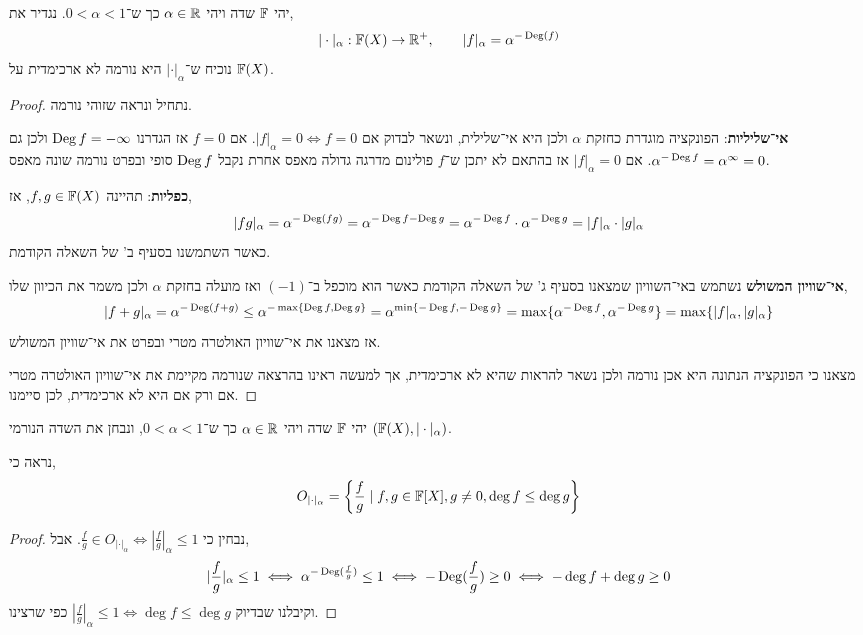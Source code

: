 \question{}
יהי $\mathbb{F}$ שדה ויהי $\alpha \in \mathbb{R}$ כך ש־$0 < \alpha < 1$.
נגדיר את,
\[
	| \cdot |_{\alpha} : \mathbb{F}(X) \to \mathbb{R}^+,
	\qquad
	| f |_{\alpha} = \alpha^{- \operatorname{Deg}(f)}
\]
נוכיח ש־$| \cdot |_{\alpha}$ היא נורמה לא ארכימדית על $\mathbb{F}(X)$.
\begin{proof}
	נתחיל ונראה שזוהי נורמה.

	\textbf{אי־שליליות}:
	הפונקציה מוגדרת כחזקת $\alpha$ ולכן היא אי־שלילית, ונשאר לבדוק אם $|f|_{\alpha} = 0 \iff f = 0$.
	אם $f = 0$ אז הגדרנו $\operatorname{Deg} f = - \infty$ ולכן גם $\alpha^{- \operatorname{Deg} f} = \alpha^{\infty} = 0$.
	אם $|f|_{\alpha} = 0$ אז בהתאם לא יתכן ש־$f$ פולינום מדרגה גדולה מאפס אחרת נקבל $\operatorname{Deg} f$ סופי ובפרט נורמה שונה מאפס.

	\textbf{כפליות}:
	תהיינה $f, g \in \mathbb{F}(X)$, אז,
	\[
		| f g |_{\alpha}
		= \alpha^{-\operatorname{Deg}(f g)}
		= \alpha^{-\operatorname{Deg} f - \operatorname{Deg} g}
		= \alpha^{-\operatorname{Deg} f} \cdot \alpha^{-\operatorname{Deg} g}
		= |f|_{\alpha} \cdot |g|_{\alpha}
	\]
	כאשר השתמשנו בסעיף ב' של השאלה הקודמת.

	\textbf{אי־שוויון המשולש}
	נשתמש באי־השוויון שמצאנו בסעיף ג' של השאלה הקודמת כאשר הוא מוכפל ב־$(-1)$ ואז מועלה בחזקת $\alpha$ ולכן משמר את הכיוון שלו,
	\[
		|f + g|_{\alpha}
		= \alpha^{-\operatorname{Deg}(f + g)}
		\le \alpha^{-\max\{\operatorname{Deg} f, \operatorname{Deg} g\}}
		= \alpha^{\min\{-\operatorname{Deg} f, -\operatorname{Deg} g\}}
		= \max\{ \alpha^{-\operatorname{Deg} f}, \alpha^{-\operatorname{Deg} g} \}
		= \max\{ |f|_{\alpha}, |g|_{\alpha} \}
	\]
	אז מצאנו את אי־שוויון האולטרה מטרי ובפרט את אי־שוויון המשולש.

	מצאנו כי הפונקציה הנתונה היא אכן נורמה ולכן נשאר להראות שהיא לא ארכימדית, אך למעשה ראינו בהרצאה שנורמה מקיימת את אי־שוויון האולטרה מטרי אם ורק אם היא לא ארכימדית, לכן סיימנו.
\end{proof}

\question{}
יהי $\mathbb{F}$ שדה ויהי $\alpha \in \mathbb{R}$ כך ש־$0 < \alpha < 1$, ונבחן את השדה הנורמי $(\mathbb{F}(X), | \cdot |_{\alpha})$.

\subquestion{}
נראה כי,
\[
	O_{| \cdot |_{\alpha}}
	= \left\{ \frac{f}{g} \mid f, g \in \mathbb{F}[X], g \ne 0, \deg f \le \deg g \right\}
\]
\begin{proof}
	נבחין כי $\frac{f}{g} \in O_{| \cdot |_{\alpha}} \iff | \frac{f}{g} |_{\alpha} \le 1$.
	אבל,
	\[
		|\frac{f}{g}|_{\alpha} \le 1
		\iff \alpha^{-\operatorname{Deg}(\frac{f}{g})} \le 1
		\iff -\operatorname{Deg}(\frac{f}{g}) \ge 0
		\iff -\deg f + \deg g \ge 0
	\]
	וקיבלנו שבדיוק $|\frac{f}{g}|_{\alpha} \le 1 \iff \deg f \le \deg g$ כפי שרצינו.
\end{proof}

